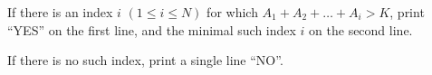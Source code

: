 If there is an index $i$ $(1 \le i \le N)$ for which $A_1 + A_2 + \ldots + A_i > K$, print ``YES'' on the first line, and the minimal such index $i$ on the second line.

If there is no such index, print a single line ``NO''.